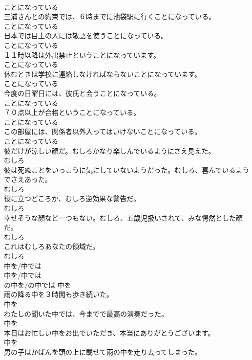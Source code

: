 \documentclass[8pt]{extreport}
\begin{document}
\begin{CJK}{UTF8}{min}
\\	ことになっている	
\\	三浦さんとの約束では、６時までに池袋駅に行くことになっている。	
\\	ことになっている	
\\	日本では目上の人には敬語を使うことになっている。	
\\	ことになっている	
\\	１１時以降は外出禁止ということになっています。	
\\	ことになっている	
\\	休むときは学校に連絡しなければならないことになっています。	
\\	ことになっている	
\\	今度の日曜日には、彼氏と会うことになっている。	
\\	ことになっている	
\\	７０点以上が合格ということになっている。	
\\	ことになっている	
\\	この部屋には、関係者以外入ってはいけないことになっている。	
\\	ことになっている	
\\	彼だけが涼しい顔だ。むしろかなり楽しんでいるようにさえ見えた。	
\\	むしろ	
\\	彼は死ぬことをいっこうに気にしていないようだった。むしろ、喜んでいるようでさえあった。	
\\	むしろ	
\\	役に立つどころか、むしろ逆効果な警告だ。	
\\	むしろ	
\\	幸せそうな顔など一つもない。むしろ、五歳児扱いされて、みな愕然とした顔だ。	
\\	むしろ	
\\	これはむしろあなたの領域だ。	
\\	むしろ	
\\	中を/中では	
\\	中を/中では	
\\	の中を/の中では	中を	
\\	雨の降る中を３時間も歩き続いた。	
\\	中を	
\\	わたしの聞いた中では、今までで最高の演奏だった。	
\\	中を	
\\	本日はお忙しい中をお出でいただき、本当にありがとうございます。	
\\	中を	
\\	男の子はかばんを頭の上に載せて雨の中を走り去ってしまった。	

\end{CJK}
\end{document}
